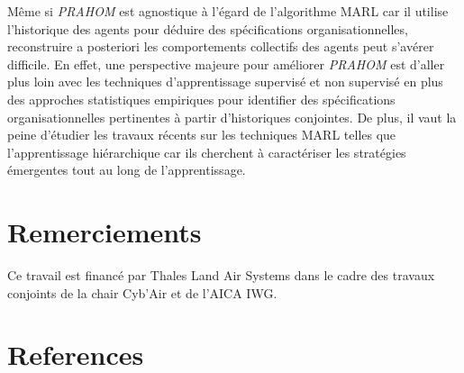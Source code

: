 \documentclass[demonstration]{jfsma}
\begin{document}
Même si \emph{PRAHOM} est agnostique à l'égard de l'algorithme MARL car il utilise l'historique des agents pour déduire des spécifications organisationnelles, reconstruire a posteriori les comportements collectifs des agents peut s'avérer difficile. En effet, une perspective majeure pour améliorer \emph{PRAHOM} est d'aller plus loin avec les techniques d'apprentissage supervisé et non supervisé en plus des approches statistiques empiriques pour identifier des spécifications organisationnelles pertinentes à partir d'historiques conjointes. De plus, il vaut la peine d’étudier les travaux récents sur les techniques MARL telles que l’apprentissage hiérarchique car ils cherchent  à caractériser les stratégies émergentes tout au long de l’apprentissage.



\section*{Remerciements}

Ce travail est financé par Thales Land Air Systems dans le cadre des travaux conjoints de la chair Cyb'Air et de l'AICA IWG.

\section*{References}
\small


\end{document}
